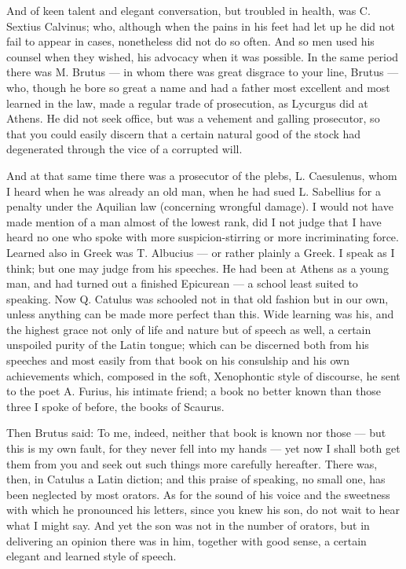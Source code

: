  And of keen talent and elegant conversation, but troubled in health, was C. Sextius Calvinus; who, although when the pains in his feet had let up he did not fail to appear in cases, nonetheless did not do so often. And so men used his counsel when they wished, his advocacy when it was possible. In the same period there was M. Brutus — in whom there was great disgrace to your line, Brutus — who, though he bore so great a name and had a father most excellent and most learned in the law, made a regular trade of prosecution, as Lycurgus did at Athens. He did not seek office, but was a vehement and galling prosecutor, so that you could easily discern that a certain natural good of the stock had degenerated through the vice of a corrupted will.

 And at that same time there was a prosecutor of the plebs, L. Caesulenus, whom I heard when he was already an old man, when he had sued L. Sabellius for a penalty under the Aquilian law (concerning wrongful damage). I would not have made mention of a man almost of the lowest rank, did I not judge that I have heard no one who spoke with more suspicion-stirring or more incriminating force. Learned also in Greek was T. Albucius — or rather plainly a Greek. I speak as I think; but one may judge from his speeches. He had been at Athens as a young man, and had turned out a finished Epicurean — a school least suited to speaking. Now Q. Catulus was schooled not in that old fashion but in our own, unless anything can be made more perfect than this. Wide learning was his, and the highest grace not only of life and nature but of speech as well, a certain unspoiled purity of the Latin tongue; which can be discerned both from his speeches and most easily from that book on his consulship and his own achievements which, composed in the soft, Xenophontic style of discourse, he sent to the poet A. Furius, his intimate friend; a book no better known than those three I spoke of before, the books of Scaurus.

 Then Brutus said: To me, indeed, neither that book is known nor those — but this is my own fault, for they never fell into my hands — yet now I shall both get them from you and seek out such things more carefully hereafter. There was, then, in Catulus a Latin diction; and this praise of speaking, no small one, has been neglected by most orators. As for the sound of his voice and the sweetness with which he pronounced his letters, since you knew his son, do not wait to hear what I might say. And yet the son was not in the number of orators, but in delivering an opinion there was in him, together with good sense, a certain elegant and learned style of speech.

